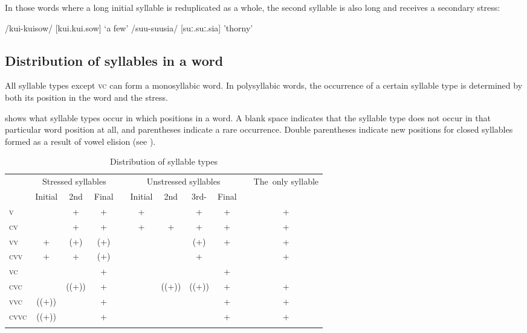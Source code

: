 In those words where a long initial syllable is reduplicated as a whole, the second syllable is also long and receives a secondary stress:

\ea
\ea
/kui-kuisow/  [{{\textprimstress}}kui.{{\textprimstress}}{{\textprimstress}}kui.sow]  `a few'
\ex
/suu-suusia/  [{{\textprimstress}}suː.{{\textprimstress}}{{\textprimstress}}suː.sia]  'thorny'
\z
\z

\subsection{Distribution of syllables in a word}\label{sec:2:y:x}

All syllable types except  \textsc{vc} can form a monosyllabic word. In polysyllabic words, the occurrence of a certain syllable type is determined by both its position in the word and the stress. 

 shows what syllable types occur in which positions in a word.  A blank space indicates that the syllable type does not occur in that particular word position at all, and parentheses indicate a rare occurrence. Double parentheses indicate new positions for closed syllables formed as a result of vowel elision (see ). 



\begin{table}
\caption{Distribution of syllable types}
\label{tab:7:syllabletypes}
  \begin{tabular}{lcccccccccc}
  \mytoprule
  \multirow{2}{*}{\parbox{1cm}{Syllable\\type}} & \multicolumn{3}{c}{Stressed syllables} &  & \multicolumn{4}{c}{Unstressed syllables}  &  & \multirow{2}{*}{\parbox{1.2cm}{\mbox{The only} \mbox{syllable}}}\\
  & Initial & 2nd{\footnotemark} & Final &  & Initial & 2nd & 3rd- & Final &  & \\
  \midrule
  \textsc{v} &  & + & + &  & + &  & + & + &  & +\\
  \textsc{cv} &  & + & + &  & + & + & + & + &  & +\\
  \textsc{vv} & + & (+) & (+) &  &  &  & (+) & + &  & +\\
  \textsc{cvv} & + & + & (+) &  &  &  & + &  &  & +\\
  \textsc{vc} &  &  & + &  &  &  &  & + &  & \\
  \textsc{cvc} &  & ((+)) & + &  &  & ((+)) & ((+)) & + &  & +\\
  \textsc{vvc} & ((+)) &  & + &  &  &  &  & + &  & +\\
  \textsc{cvvc} & ((+)) &  & + &  &  &  &  & + &  & +\\
  \mybottomrule
  \end{tabular}
\end{table}


